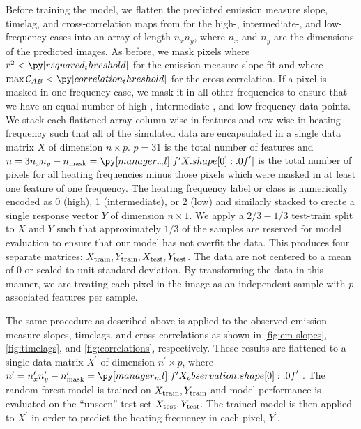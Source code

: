 Before training the model, we flatten the predicted emission measure slope, timelag, and cross-correlation maps from  for the high-, intermediate-, and low-frequency cases into an array of length $n_xn_y$, where $n_x$ and $n_y$ are the dimensions of the predicted images. As before, we mask pixels where $r^2<\py|rsquared_threshold|$ for the emission measure slope fit and where $\max\mathcal{C}_{AB}<\py|correlation_threshold|$ for the cross-correlation. If a pixel is masked in one frequency case, we mask it in all other frequencies to ensure that we have an equal number of high-, intermediate-, and low-frequency data points. We stack each flattened array column-wise in features and row-wise in heating frequency such that all of the simulated data are encapsulated in a single data matrix $X$ of dimension $n\times p$. $p=31$ is the total number of features and $n=3n_xn_y - n_\textup{mask}=\py[manager_ml]|f'{X.shape[0]:.0f}'|$ is the total number of pixels for all heating frequencies minus those pixels which were masked in at least one feature of one frequency. The heating frequency label or class is numerically encoded as 0 (high), 1 (intermediate), or 2 (low) and similarly stacked to create a single response vector $Y$ of dimension $n\times1$. We apply a $2/3-1/3$ test-train split to $X$ and $Y$ such that approximately $1/3$ of the samples are reserved for model evaluation to ensure that our model has not overfit the data. This produces four separate matrices: $X_\textup{train},Y_\textup{train},X_\textup{test},Y_\textup{test}$. The data are not centered to a mean of 0 or scaled to unit standard deviation. By transforming the data in this manner, we are treating each pixel in the image as an independent sample with $p$ associated features per sample.

The same procedure as described above is applied to the observed emission measure slopes, timelags, and cross-correlations as shown in \autoref{fig:em-slopes}, \autoref{fig:timelags}, and \autoref{fig:correlations}, respectively. These results are flattened to a single data matrix $X^\prime$ of dimension $n^\prime\times p$, where $n^\prime=n_x^\prime n_y^\prime - n^\prime_\textup{mask}=\py[manager_ml]|f'{X_observation.shape[0]:.0f}'|$. The random forest model is trained on $X_\textup{train},Y_\textup{train}$ and model performance is evaluated on the ``unseen'' test set $X_\textup{test},Y_\textup{test}$. The trained model is then applied to $X^\prime$ in order to predict the heating frequency in each pixel, $Y^\prime$.

